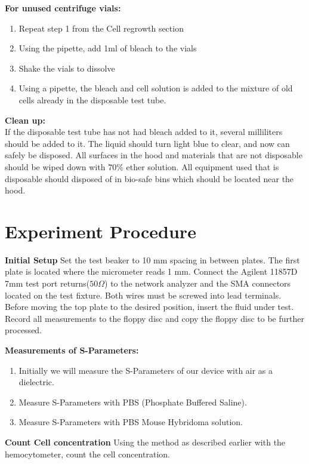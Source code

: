\documentclass[journal]{IEEEtran}
\begin{document}
\textbf{For unused centrifuge vials:}
\begin{enumerate}
\item Repeat step 1 from the Cell regrowth section
\item Using the pipette, add 1ml of bleach to the vials
\item Shake the vials to dissolve
\item Using a pipette, the bleach and cell solution is added to the mixture of old cells already in the disposable test tube. 
\end{enumerate}

\textbf{Clean up:} \\
If the disposable test tube has not had bleach added to it, several milliliters should be added to it. The liquid should turn light blue to clear, and now can safely be disposed. All surfaces in the hood and materials that are not disposable should be wiped down with 70\% ether solution. All equipment used that is disposable should disposed of in bio-safe bins which should be located near the hood. 

\section{Experiment Procedure}

\textbf{Initial Setup}
Set the test beaker to 10 mm spacing in between plates. The first plate is located where the micrometer reads 1 mm. Connect the Agilent 11857D 7mm test port returns($50\Omega$) to the network analyzer and the SMA connectors located on the test fixture. Both wires must be screwed into lead terminals. Before moving the top plate to the desired position, insert the fluid under test. Record all measurements to the floppy disc and copy the floppy disc to be further processed. 

\textbf{Measurements of S-Parameters:}
\begin{enumerate}
	\item Initially we will measure the S-Parameters of our device with air as a dielectric.
	\item Measure S-Parameters with PBS (Phosphate Buffered Saline).
	\item Measure S-Parameters with PBS Mouse Hybridoma solution.
\end{enumerate}

\textbf{Count Cell concentration}
Using the method as described earlier with the hemocytometer, count the cell concentration.
\end{document}
